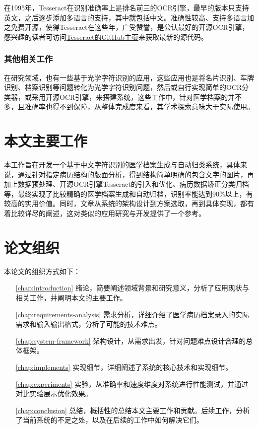 在1995年，Tesseract在识别准确率上是排名前三的OCR引擎，最早的版本只支持英文，之后逐步添加多语言的支持，其中就包括中文。准确性较高、支持多语言加之免费开源，使得Tesseract在这些年，广受赞誉，是公认最好的开源OCR引擎，感兴趣的读者可访问\href{https://github.com/tesseract-ocr/tesseract}{Tesseract的GitHub主页}来获取最新的源代码。

\subsubsection{其他相关工作}
在研究领域，也有一些基于光学字符识别的应用\citep{SongWan, HongfengLi, TikunHu}，这些应用也是将名片识别、车牌识别、档案识别等问题转化为光学字符识别问题，然后或自行实现简单的OCR分类器，或采用开源OCR引擎，来搭建系统，这些工作中，针对医学档案的并不多\citep{MinghuaXiang}，且准确率也得不到保障，从整体完成度来看，其学术探索意味大于实际使用。

\section{本文主要工作}
本工作旨在开发一个基于中文字符识别的医学档案生成与自动归类系统，具体来说，通过针对指定病历结构的版面分析，得到结构简单明确的包含文字的图片，再加上数据预处理、开源OCR引擎Tesseract的引入和优化、病历数据矫正分类归档等，最终实现了比较精确的医学档案生成和自动归档，识别率能达到90\%以上，有较高的实用价值。同时，文章从系统的架构设计到方案选取，再到具体实现，都有着比较详尽的阐述，这对类似的应用研究与开发提供了一个参考。

\section{论文组织}
本论文的组织方式如下：
\begin{itemize}
	\item[\autoref{chap:introduction}]
	绪论，简要阐述领域背景和研究意义，分析了应用现状与相关工作，并阐明本文的主要工作。
	\item[\autoref{chap:requirements-analysis}] 需求分析，详细介绍了医学病历档案录入的实际需求和输入输出格式，分析了可能的技术难点。
	\item[\autoref{chap:system-framework}]
	架构设计，从需求出发，针对问题难点设计合理的总体框架。
	\item[\autoref{chap:implements}]
	实现细节，详细阐述了系统的核心技术和实现细节。
	\item[\autoref{chap:experiments}]
	实验，从准确率和速度维度对系统进行性能测试，并通过对比实验展示优化效果。
	\item[\autoref{chap:conclusion}]
	总结，概括性的总结本文主要工作和贡献。后续工作，分析了当前系统的不足之处，以及在后续的工作中如何解决它们。
\end{itemize}

